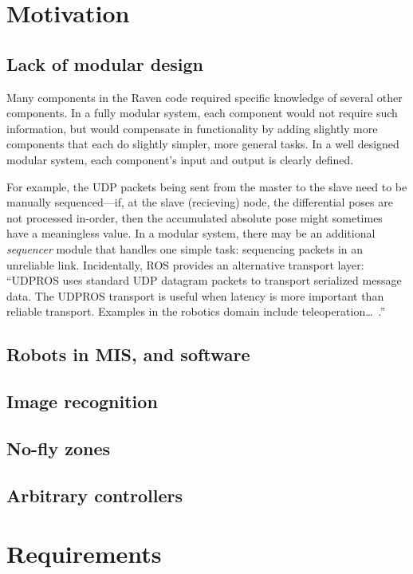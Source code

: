 \documentclass[letterpaper,twocolumn,10pt]{article}
\begin{document}
\section{Motivation}

\subsection{Lack of modular design}

Many components in the Raven code required specific knowledge of
several other components. In a fully modular system, each component
would not require such information, but would compensate in
functionality by adding slightly more components that each do slightly
simpler, more general tasks. In a well designed modular system, each
component's input and output is clearly defined.

For example, the UDP packets being sent from the master to the slave
need to be manually sequenced---if, at the slave (recieving) node, the
differential poses are not processed in-order, then the accumulated
absolute pose might sometimes have a meaningless value. In a modular
system, there may be an additional \emph{sequencer} module that
handles one simple task: sequencing packets in an unreliable
link. Incidentally, ROS provides an alternative transport layer:
``UDPROS uses standard UDP datagram packets to transport serialized
message data. The UDPROS transport is useful when latency is more
important than reliable transport. Examples in the robotics domain
include teleoperation\ldots~\cite{udpros}.''

\subsection{Robots in MIS, and software}

\subsection{Image recognition}

\subsection{No-fly zones}

\subsection{Arbitrary controllers}

\section{Requirements}
\end{document}
